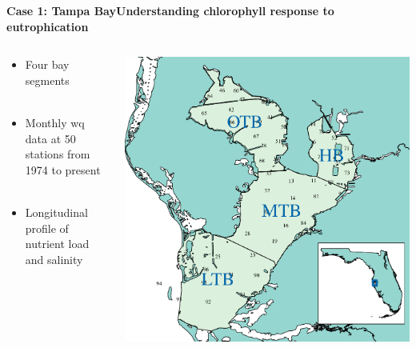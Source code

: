 \documentclass[serif]{beamer}\usepackage[]{graphicx}\usepackage[]{color}
\begin{document}
\begin{frame}{\textbf{Case 1: Tampa Bay}}{\textbf{Understanding chlorophyll response to eutrophication}}
\begin{columns}
\begin{column}{0.5\textwidth}
\begin{itemize}
\item Four bay segments\\~\\
\item Monthly wq data at 50 stations from 1974 to present \\~\\
\item Longitudinal profile of nutrient load and salinity \\~\\
\end{itemize}
\vspace{0cm}\hspace*{15pt}
\end{column}
\begin{column}{0.5\textwidth}
\centerline{\includegraphics[width = \textwidth]{fig/tb_map.pdf}}
\end{column}
\end{columns}
\end{frame}
\end{document}
